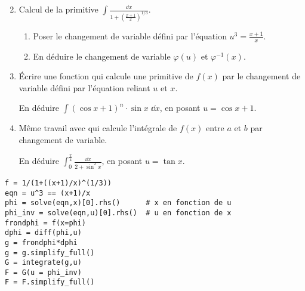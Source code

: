 \begin{frame}
\begin{tp}
\begin{enumerate}
		  \setcounter{enumi}{1}
  
  \item Calcul de la primitive $\displaystyle\int \frac{\dd x}{1+\left(\frac{x+1}{x}\right)^{1/3}}$.
  \begin{enumerate}  
    \item Poser le changement de variable défini par l'équation $u^3 = \frac{x+1}{x}$.
    
    \item En déduire le changement de variable $\varphi(u)$ et $\varphi^{-1}(x)$.
  \end{enumerate}
  
  
  \item \'Ecrire une fonction  qui calcule
   une primitive de $f(x)$ par le changement de variable défini par l'équation 
    reliant $u$ et $x$.
  
  En déduire $\displaystyle\int (\cos x + 1)^n \cdot \sin x \; \dd x$, en posant $u= \cos x + 1$.
  
  \item Même travail avec 
   qui calcule l'intégrale de $f(x)$ entre $a$ et $b$ par changement de variable.
  
  En déduire $\displaystyle\int_0^{\frac\pi4} \frac{\dd x}{2+\sin^2 x}$, en posant $u = \tan x$.
\end{enumerate}
\end{tp}

\end{frame}

\begin{frame}[fragile]




\begin{algo}
\begin{lstlisting}
f = 1/(1+((x+1)/x)^(1/3))
eqn = u^3 == (x+1)/x
phi = solve(eqn,x)[0].rhs()      # x en fonction de u 
phi_inv = solve(eqn,u)[0].rhs()  # u en fonction de x
frondphi = f(x=phi)
dphi = diff(phi,u)
g = frondphi*dphi
g = g.simplify_full()
G = integrate(g,u)
F = G(u = phi_inv)
F = F.simplify_full()
\end{lstlisting}
\end{algo}
\end{frame}



